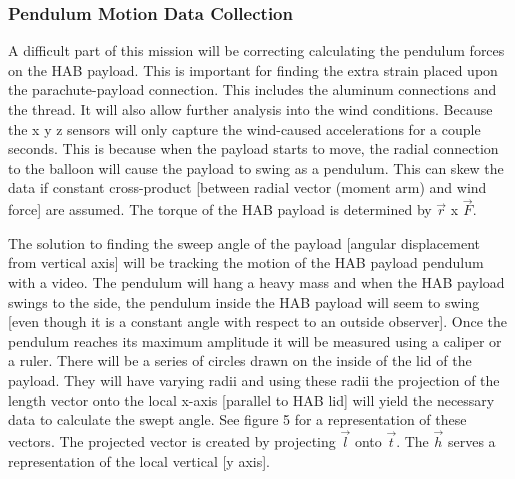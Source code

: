\documentclass[journal]{SPEXformat}
\begin{document}
\subsubsection{Pendulum Motion Data Collection}
\label{subsubsec: pendulum motion data collection}

  A difficult part of this mission will be correcting calculating the pendulum forces on the HAB payload. This is important
  for finding the extra strain placed upon the parachute-payload connection. This includes the aluminum connections and the
  thread. It will also allow further analysis into the wind conditions. Because the x y z sensors will only capture the
  wind-caused accelerations for a couple seconds. This is because when the payload starts to move, the radial connection to the balloon will cause
  the payload to swing as a pendulum. This can skew the data if constant cross-product [between radial vector (moment arm) and wind force]
  are assumed. The torque of the HAB payload is determined by $\vec{r}$ x $\vec{F}$.

  The solution to finding the sweep angle of the payload [angular displacement from vertical axis] will be tracking
  the motion of the HAB payload pendulum with a video. The pendulum will hang a heavy mass and when the HAB payload swings
  to the side, the pendulum inside the HAB payload will seem to swing [even though it is a constant angle with respect
  to an outside observer]. Once the pendulum reaches its maximum amplitude it will be measured using a caliper or a ruler.
  There will be a series of circles drawn on the inside of the lid of the payload. They will have varying radii and using these
  radii the projection of the length vector onto the local x-axis [parallel to HAB lid] will yield the necessary data
  to calculate the swept angle. See figure 5 for a representation of these vectors. The projected vector is created
  by projecting $\vec{l}$ onto $\vec{t}$. The $\vec{h}$ serves a representation of the local vertical [y axis].
\end{document}
